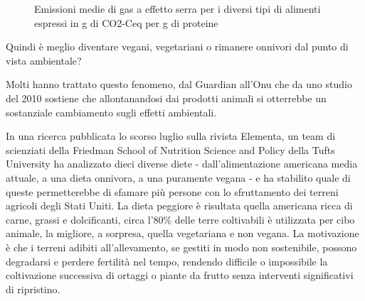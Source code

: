 \documentclass[12pt]{book} %
\begin{document}
\needspace{4cm}
\begin{figure}[H]
\centering
{}
\caption{Emissioni medie di gas a effetto serra per i diversi tipi di alimenti espressi in g di CO2-Ceq per g di proteine}
\end{figure}

Quindi è meglio diventare vegani, vegetariani o rimanere onnivori dal punto di vista ambientale?

Molti hanno trattato questo fenomeno, dal
Guardian
all'Onu che da uno studio del 2010 sostiene che allontanandosi dai prodotti animali si otterrebbe un sostanziale cambiamento
sugli effetti ambientali.

In una ricerca pubblicata lo scorso luglio sulla rivista Elementa, un team di scienziati della Friedman School of Nutrition Science
and Policy della Tufts University ha analizzato dieci diverse diete - dall'alimentazione americana media attuale, a una
dieta onnivora, a una puramente vegana - e ha stabilito quale di queste permetterebbe di sfamare più persone con lo
sfruttamento dei terreni agricoli degli Stati Uniti. La dieta peggiore è risultata quella americana ricca di carne,
grassi e dolcificanti, circa l'80\% delle terre coltivabili è utilizzata per cibo animale, la
migliore, a sorpresa, quella vegetariana e non vegana. La motivazione è che i terreni adibiti all'allevamento, se gestiti in modo non sostenibile, possono degradarsi e perdere fertilità nel tempo, rendendo difficile o impossibile la coltivazione successiva di ortaggi o piante da frutto senza interventi significativi di ripristino.
\end{document}
